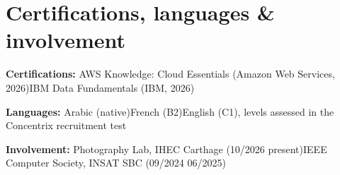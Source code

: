 \documentclass[10pt]{article}
\newcommand{\sep}{\enspace\textperiodcentered\enspace}
\begin{document}
\section{Certifications, languages \& involvement}
\textbf{Certifications:} AWS Knowledge: Cloud Essentials (Amazon Web Services, 2026)\sep IBM Data Fundamentals (IBM, 2026)\par
\textbf{Languages:} Arabic (native)\sep French (B2)\sep English (C1), levels assessed in the Concentrix recruitment test\par
\textbf{Involvement:} Photography Lab, IHEC Carthage (10/2026 \textendash{} present)\sep IEEE Computer Society, INSAT SBC (09/2024 \textendash{} 06/2025)\par
\end{document}
